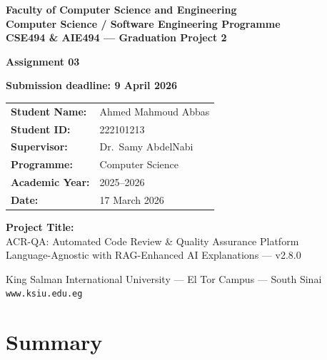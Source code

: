 \documentclass[12pt,a4paper]{article}
\begin{document}

\begin{titlepage}
\centering\vspace*{1cm}
{\Large\bfseries Faculty of Computer Science and Engineering\\[0.3em]
Computer Science / Software Engineering Programme\\[0.3em]
CSE494 \& AIE494 --- Graduation Project 2}
\vspace{1.5cm}

{\Huge\bfseries\color{ksiugold} Assignment 03}
\vspace{0.8cm}

{\large\bfseries\color{codered} Submission deadline: 9 April 2026}
\vspace{1.5cm}

\begin{tabular}{ll}
\textbf{Student Name:} & Ahmed Mahmoud Abbas \\[0.3em]
\textbf{Student ID:}   & 222101213 \\[0.3em]
\textbf{Supervisor:}   & Dr.\ Samy AbdelNabi \\[0.3em]
\textbf{Programme:}    & Computer Science \\[0.3em]
\textbf{Academic Year:}& 2025--2026 \\[0.3em]
\textbf{Date:}         & 17 March 2026 \\
\end{tabular}
\vspace{1.5cm}

{\large\bfseries Project Title:}\\[0.4em]
{\Large ACR-QA: Automated Code Review \& Quality Assurance Platform}\\[0.3em]
{\normalsize Language-Agnostic with RAG-Enhanced AI Explanations --- v2.8.0}
\vspace{2cm}

{\footnotesize King Salman International University --- El Tor Campus --- South Sinai\\
\texttt{www.ksiu.edu.eg}}
\end{titlepage}

\newpage
\tableofcontents
\newpage

\section{Summary}
\end{document}
